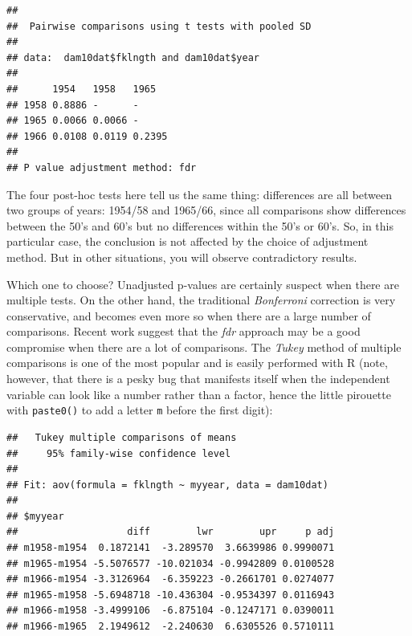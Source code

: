 \documentclass[
  12pt,
]{book}
\newenvironment{Shaded}{\begin{snugshade}}{\end{snugshade}}
\newcommand{\DataTypeTok}[1]{\textcolor[rgb]{0.13,0.29,0.53}{#1}}
\newcommand{\KeywordTok}[1]{\textcolor[rgb]{0.13,0.29,0.53}{\textbf{#1}}}
\newcommand{\NormalTok}[1]{#1}
\newcommand{\OperatorTok}[1]{\textcolor[rgb]{0.81,0.36,0.00}{\textbf{#1}}}
\newcommand{\StringTok}[1]{\textcolor[rgb]{0.31,0.60,0.02}{#1}}
\begin{document}
\begin{verbatim}
## 
##  Pairwise comparisons using t tests with pooled SD 
## 
## data:  dam10dat$fklngth and dam10dat$year 
## 
##      1954   1958   1965  
## 1958 0.8886 -      -     
## 1965 0.0066 0.0066 -     
## 1966 0.0108 0.0119 0.2395
## 
## P value adjustment method: fdr
\end{verbatim}

The four post-hoc tests here tell us the same thing: differences are all between two groups of years: 1954/58 and 1965/66, since all comparisons show differences between the 50's and 60's but no differences within the 50's or 60's. So, in this particular case, the conclusion is not affected by the choice of adjustment method. But in other situations, you will observe contradictory results.

Which one to choose? Unadjusted p-values are certainly suspect when there are multiple tests. On the other hand, the traditional \emph{Bonferroni} correction is very conservative, and becomes even more so when there are a large number of comparisons. Recent work suggest that the \emph{fdr} approach may be a good compromise when there are a lot of comparisons. The \emph{Tukey} method of multiple comparisons is one of the most popular and is easily performed with R (note, however, that there is a pesky bug that manifests itself when the independent variable can look like a number rather than a factor, hence the little pirouette with \texttt{paste0()} to add a letter \texttt{m} before the first digit):

\begin{Shaded}
\end{Shaded}

\begin{verbatim}
##   Tukey multiple comparisons of means
##     95% family-wise confidence level
## 
## Fit: aov(formula = fklngth ~ myyear, data = dam10dat)
## 
## $myyear
##                   diff        lwr        upr     p adj
## m1958-m1954  0.1872141  -3.289570  3.6639986 0.9990071
## m1965-m1954 -5.5076577 -10.021034 -0.9942809 0.0100528
## m1966-m1954 -3.3126964  -6.359223 -0.2661701 0.0274077
## m1965-m1958 -5.6948718 -10.436304 -0.9534397 0.0116943
## m1966-m1958 -3.4999106  -6.875104 -0.1247171 0.0390011
## m1966-m1965  2.1949612  -2.240630  6.6305526 0.5710111
\end{verbatim}
\end{document}
